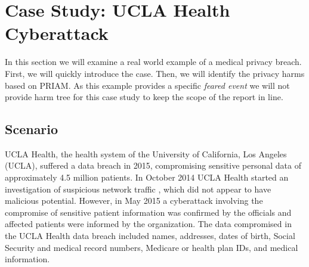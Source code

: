 \section{Case Study: UCLA Health Cyberattack}
In this section we will examine a real world example of a medical privacy breach. First, we will quickly introduce the case. Then, we will identify the privacy harms based on PRIAM. As this example provides a specific \textit{feared event} we will not provide harm tree for this case study to keep the scope of the report in line.\\
\subsection{Scenario}
UCLA Health, the health system of the University of California, Los Angeles (UCLA), suffered a data breach in 2015, compromising sensitive personal data of approximately 4.5 million patients. In October 2014 UCLA Health started an investigation of suspicious network traffic , which did not appear to have malicious potential. However, in May 2015 a cyberattack involving the compromise of sensitive patient information was confirmed by the officials and affected patients were informed by the organization. The data compromised in the UCLA Health data breach included names, addresses, dates of birth, Social Security and medical record numbers, Medicare or health plan IDs, and medical information.\cite{uclahealthbreach}
